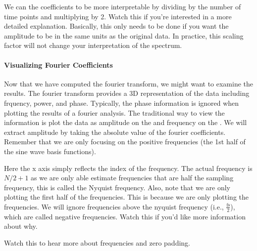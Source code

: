 \documentclass[letterpaper,10pt,english]{sphinxmanual}
\begin{document}
We can  the coefficients to be more interpretable by dividing by the number of time points and multiplying by 2. Watch this  if you’re interested in a more detailed explanation. Basically, this only needs to be done if you want the amplitude to be in the same units as the original data. In practice, this scaling factor will not change your interpretation of the spectrum.

\begin{sphinxVerbatim}[commandchars=\\\{\}]
   
\end{sphinxVerbatim}


\paragraph{Visualizing Fourier Coefficients}
\label{\detokenize{content/Signal_Processing:visualizing-fourier-coefficients}}
Now that we have computed the fourier transform, we might want to examine the results.  The fourier transform provides a 3\sphinxhyphen{}D representation of the data including frquency, power, and phase. Typically, the phase information is ignored when plotting the results of a fourier analysis. The traditional way to view the information is plot the data as amplitude on the  and frequency on the . We will extract amplitude by taking the absolute value of the fourier coefficients. Remember that we are only focusing on the positive frequencies (the 1st half of the sine wave basis functions).

Here the x axis simply reflects the index of the frequency.  The actual frequency is \(N/2 + 1\) as we are only able estimate frequencies that are half the sampling frequency, this is called the Nyquist frequency. Also, note that we are only plotting the first half of the frequencies. This is because we are only plotting the  frequencies. We will ignore frequencies above the nyquist frequency (i.e., \(\frac{\text{fs}}{2}\)), which are called negative frequencies. Watch this  if you’d like more information about why.

Watch this  to hear more about frequencies and zero padding.
\end{document}
